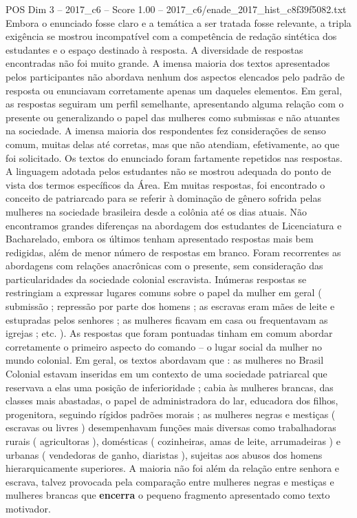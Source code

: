 \begin{textsample}{POS Dim 3 – 2017\_c6 – Score 1.00 – 2017\_c6/enade\_2017\_hist\_c8f39f5082.txt}
Embora o enunciado fosse claro e a temática a ser tratada fosse relevante, a tripla exigência se mostrou incompatível com a competência de redação sintética dos estudantes e o espaço destinado à resposta.
A diversidade de respostas encontradas não foi muito grande.
A imensa maioria dos textos apresentados pelos participantes não abordava nenhum dos aspectos elencados pelo padrão de resposta ou enunciavam corretamente apenas um daqueles elementos.
Em geral, as respostas seguiram um perfil semelhante, apresentando alguma relação com o presente ou generalizando o papel das mulheres como submissas e não atuantes na sociedade.
A imensa maioria dos respondentes fez considerações de senso comum, muitas delas até corretas, mas que não atendiam, efetivamente, ao que foi solicitado.
Os textos do enunciado foram fartamente repetidos nas respostas.
A linguagem adotada pelos estudantes não se mostrou adequada do ponto de vista dos termos específicos da Área.
Em muitas respostas, foi encontrado o conceito de patriarcado para se referir à dominação de gênero sofrida pelas mulheres na sociedade brasileira desde a colônia até os dias atuais.
Não encontramos grandes diferenças na abordagem dos estudantes de Licenciatura e Bacharelado, embora os últimos tenham apresentado respostas mais bem redigidas, além de menor número de respostas em branco.
Foram recorrentes as abordagens com relações anacrônicas com o presente, sem consideração das particularidades da sociedade colonial escravista.
Inúmeras respostas se restringiam a expressar lugares comuns sobre o papel da mulher em geral ( submissão ; repressão por parte dos homens ; as escravas eram mães de leite e estupradas pelos senhores ; as mulheres ficavam em casa ou frequentavam as igrejas ; etc. ).
As respostas que foram pontuadas tinham em comum abordar corretamente o primeiro aspecto do comando – o lugar social da mulher no mundo colonial.
Em geral, os textos abordavam que : as mulheres no Brasil Colonial estavam inseridas em um contexto de uma sociedade patriarcal que reservava a elas uma posição de inferioridade ; cabia às mulheres brancas, das classes mais abastadas, o papel de administradora do lar, educadora dos filhos, progenitora, seguindo rígidos padrões morais ; as mulheres negras e mestiças ( escravas ou livres ) desempenhavam funções mais diversas como trabalhadoras rurais ( agricultoras ), domésticas ( cozinheiras, amas de leite, arrumadeiras ) e urbanas ( vendedoras de ganho, diaristas ), sujeitas aos abusos dos homens hierarquicamente superiores.
A maioria não foi além da relação entre senhora e escrava, talvez provocada pela comparação entre mulheres negras e mestiças e mulheres brancas que \textbf{encerra} o pequeno fragmento apresentado como texto motivador.

\end{textsample}
